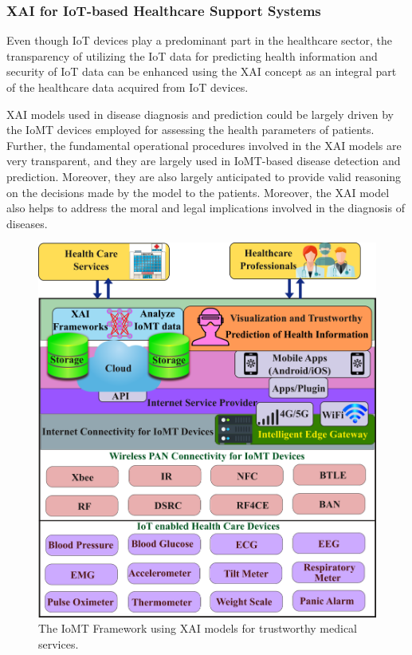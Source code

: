 \documentclass[journal]{IEEEtran}
\begin{document}
\subsubsection{XAI for IoT-based Healthcare Support Systems}
Even though IoT devices play a predominant part in the healthcare sector, the transparency of utilizing the IoT data for predicting health information and security of IoT data can be enhanced using the XAI concept as an integral part of the healthcare data acquired from IoT devices.

XAI models used in disease diagnosis and prediction could be largely driven by the IoMT devices employed for assessing the health parameters of patients. Further, the fundamental operational procedures involved in the XAI models are very transparent, and they are largely used in IoMT-based disease detection and prediction. Moreover, they are also largely anticipated to provide valid reasoning on the decisions made by the model to the patients. Moreover, the XAI model also helps to address the moral and legal implications involved in the diagnosis of diseases. 

\begin{figure}[!ht]
  \centering    
  \includegraphics[width=1.0\linewidth]{figures/IoMTXAI.png}
  \caption{The IoMT Framework using XAI models for trustworthy medical services.}
     \label{fig:IoMTXAI}
\end{figure}
\end{document}
